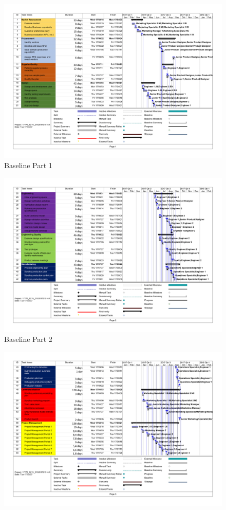 \begin{appendices}
\begin{landscape}
\begin{figure}[H]
\centering
\includegraphics[scale=0.253]{baseline/baseline2-1.png}
\caption{Baseline Part 1}
\end{figure}
\begin{figure}[H]
\centering
\includegraphics[scale=0.263]{baseline/baseline2-2.png}
\caption{Baseline Part 2}
\end{figure}
\begin{figure}[H]
\centering
\includegraphics[scale=0.2613]{baseline/baseline2-3.png}

\end{figure}
\end{landscape}
\end{appendices}
